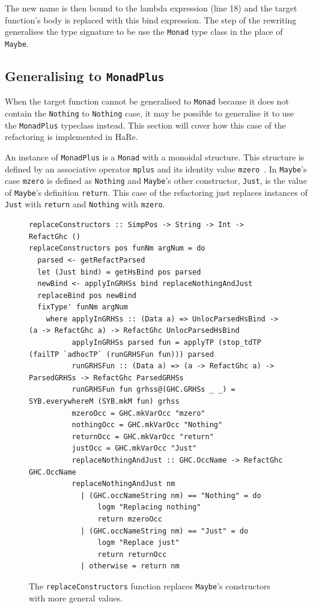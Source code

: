 The new name is then bound to the lambda expression (line 18) and the target function's body is replaced with this bind expression. The step of the rewriting generalises the type signature to be use the \texttt{Monad} type class in the place of \texttt{Maybe}.

\subsection{Generalising to \texttt{MonadPlus}}

When the target function cannot be generalised to \texttt{Monad} because it does not contain the \texttt{Nothing} to \texttt{Nothing} case, it may be possible to generalise it to use the \texttt{MonadPlus} typeclass instead. This section will cover how this case of the refactoring is implemented in HaRe.

An instance of \texttt{MonadPlus} is a \texttt{Monad} with a monoidal structure.
This structure is defined by an associative operator \texttt{mplus} and its identity value \texttt{mzero}~\citep{typeclassopedia}. 
In \texttt{Maybe}'s case \texttt{mzero} is defined as \texttt{Nothing} and \texttt{Maybe}'s other constructor, \texttt{Just}, is the value of \texttt{Maybe}'s definition \texttt{return}.
This case of the refactoring just replaces instances of \texttt{Just} with \texttt{return} and \texttt{Nothing} with \texttt{mzero}. 

\begin{figure}[t]
\begin{lstlisting}
replaceConstructors :: SimpPos -> String -> Int -> RefactGhc ()
replaceConstructors pos funNm argNum = do
  parsed <- getRefactParsed
  let (Just bind) = getHsBind pos parsed
  newBind <- applyInGRHSs bind replaceNothingAndJust
  replaceBind pos newBind
  fixType' funNm argNum
    where applyInGRHSs :: (Data a) => UnlocParsedHsBind -> (a -> RefactGhc a) -> RefactGhc UnlocParsedHsBind
          applyInGRHSs parsed fun = applyTP (stop_tdTP (failTP `adhocTP` (runGRHSFun fun))) parsed
          runGRHSFun :: (Data a) => (a -> RefactGhc a) -> ParsedGRHSs -> RefactGhc ParsedGRHSs
          runGRHSFun fun grhss@(GHC.GRHSs _ _) = SYB.everywhereM (SYB.mkM fun) grhss
          mzeroOcc = GHC.mkVarOcc "mzero"
          nothingOcc = GHC.mkVarOcc "Nothing"
          returnOcc = GHC.mkVarOcc "return"
          justOcc = GHC.mkVarOcc "Just"
          replaceNothingAndJust :: GHC.OccName -> RefactGhc GHC.OccName
          replaceNothingAndJust nm
            | (GHC.occNameString nm) == "Nothing" = do
                logm "Replacing nothing"
                return mzeroOcc
            | (GHC.occNameString nm) == "Just" = do
                logm "Replace just"
                return returnOcc            
            | otherwise = return nm
\end{lstlisting}
\caption{The \texttt{replaceConstructors} function replaces \texttt{Maybe}'s constructors with more general values.}
\label{replaceConstructors}
\end{figure}

